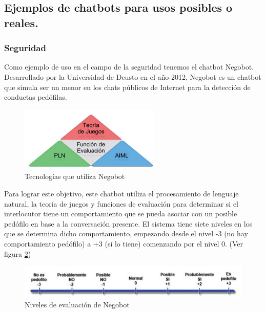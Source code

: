 \documentclass[spanish,12pt, a4paper, twoside]{paper}
\begin{document}
\subsection{Ejemplos de chatbots para usos posibles o reales.}

\subsubsection{Seguridad}

Como ejemplo de uso en el campo de la seguridad tenemos el chatbot Negobot. Desarrollado por la Universidad de Deusto en el año 2012, Negobot es un chatbot que simula ser un menor en los chats públicos de Internet para la detección de conductas pedófilas.
\newline

\begin{figure}
\centering
	\includegraphics[width=0.6\textwidth]{recursos/Negobot_tecnologia}
\caption{Tecnologías que utiliza Negobot}
\label{fig:Tecnologías de Negobot}
\end{figure}

Para lograr este objetivo, este chatbot utiliza el procesamiento de lenguaje natural, la teoría de juegos y funciones de evaluación para determinar si el interlocutor tiene un comportamiento que se pueda asociar con un posible pedófilo en base a la conversación presente. El sistema tiene siete niveles en los que se determina dicho comportamiento, empezando desde el nivel -3 (no hay comportamiento pedófilo) a +3 (sí lo tiene) comenzando por el nivel 0. (Ver figura \ref{fig:Niveles de evaluación de Negobot})
\newline

\begin{figure}
\centering
	\includegraphics[width=\textwidth]{recursos/Negobot_puntuaciones}
\caption{Niveles de evaluación de Negobot}
\label{fig:Niveles de evaluación de Negobot}
\end{figure}
\end{document}
